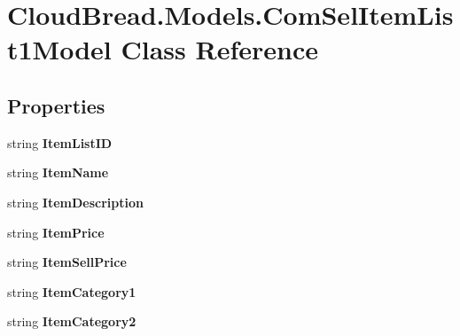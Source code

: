 \hypertarget{a00057}{}\section{Cloud\+Bread.\+Models.\+Com\+Sel\+Item\+List1\+Model Class Reference}
\label{a00057}
\subsection*{Properties}
\begin{DoxyCompactItemize}
\item 
string {\bfseries Item\+List\+ID}\hypertarget{a00057_a38cbf6b3c43bb5a53c2bdc0550e63441}{}\label{a00057_a38cbf6b3c43bb5a53c2bdc0550e63441}

\item 
string {\bfseries Item\+Name}\hypertarget{a00057_a345a3aedeae743e9035ea47c79bf7766}{}\label{a00057_a345a3aedeae743e9035ea47c79bf7766}

\item 
string {\bfseries Item\+Description}\hypertarget{a00057_ab1be2fcaf1b2a984046cf2e3e15b313e}{}\label{a00057_ab1be2fcaf1b2a984046cf2e3e15b313e}

\item 
string {\bfseries Item\+Price}\hypertarget{a00057_a40d7131bfdf6b34655ed1b56e501165c}{}\label{a00057_a40d7131bfdf6b34655ed1b56e501165c}

\item 
string {\bfseries Item\+Sell\+Price}\hypertarget{a00057_a8058d8351a6d1150a85c016f52a2bd77}{}\label{a00057_a8058d8351a6d1150a85c016f52a2bd77}

\item 
string {\bfseries Item\+Category1}\hypertarget{a00057_adaf169f77f3974fa0fabf72823fef662}{}\label{a00057_adaf169f77f3974fa0fabf72823fef662}

\item 
string {\bfseries Item\+Category2}\hypertarget{a00057_afb76c64224ec264f8aabf5c9fe105b3a}{}\label{a00057_afb76c64224ec264f8aabf5c9fe105b3a}


\end{DoxyCompactItemize}
